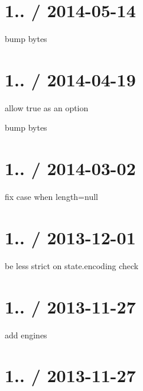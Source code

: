\section*{1.. / 2014-\/05-\/14 }


\begin{DoxyItemize}
\item bump bytes
\end{DoxyItemize}

\section*{1.. / 2014-\/04-\/19 }


\begin{DoxyItemize}
\item allow true as an option
\item bump bytes
\end{DoxyItemize}

\section*{1.. / 2014-\/03-\/02 }


\begin{DoxyItemize}
\item fix case when length=null
\end{DoxyItemize}

\section*{1.. / 2013-\/12-\/01 }


\begin{DoxyItemize}
\item be less strict on state.\+encoding check
\end{DoxyItemize}

\section*{1.. / 2013-\/11-\/27 }


\begin{DoxyItemize}
\item add engines
\end{DoxyItemize}

\section*{1.. / 2013-\/11-\/27 }


